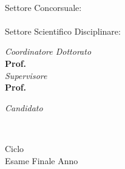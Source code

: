 \begin{titlepage}
	\begin{center}
		
		\large
		\textbf{\theschool}
		\\
		\noindent\hrulefill
		\vspace{0.4cm}
		
		\Large
		\theprogramme

		\Huge
		\vspace{4cm}
		\textbf{
			\thetitle
		}
		
		\large
		\vspace{1cm}
		Settore Concorsuale:
		\\
		\textsc{\thecontestsector}
		\\\vspace{0.5cm}
		Settore Scientifico Disciplinare:
		\\
		\textsc{\thescientificsector}

		
		\vspace{4cm}
		\begin{minipage}[t]{0.64\textwidth}
			\begin{flushleft}
				\textit{Coordinatore Dottorato} 
				\\ 
				\textbf{Prof. \thecoordinator}
				\\
				\vspace{0.4cm}
				\textit{Supervisore} 
				\\
				\textbf{Prof. \thesupervisor}
			\end{flushleft}
		\end{minipage}
		\begin{minipage}[t]{0.34\textwidth}
			\begin{flushright}
				\textit{Candidato} 
				\\ 
				\textbf{\theauthor}
			\end{flushright}
		\end{minipage}
		\\
		
		\vfill
		\noindent\hrulefill
		\vspace{0.3cm}
		\Large
		
		\thecycle{} Ciclo
		\\
		Esame Finale Anno \theexamyear
	\end{center}
\end{titlepage}
\restoregeometry
